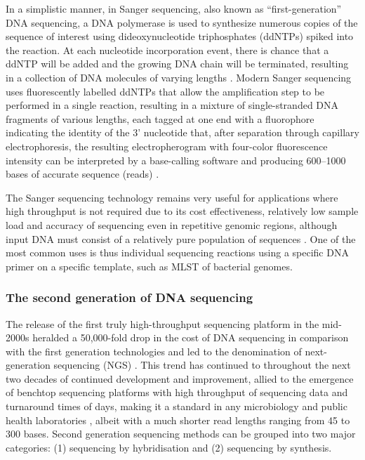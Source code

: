 In a simplistic manner, in Sanger sequencing, also known as “first-generation” DNA sequencing, a DNA polymerase is used to synthesize numerous copies of the sequence of interest using dideoxynucleotide triphosphates (ddNTPs) spiked into the reaction. At each nucleotide incorporation event, there is chance that a ddNTP will be added and the growing DNA chain will be terminated, resulting in a collection of DNA molecules of varying lengths \citep{sanger_dna_1977, hagemann_overview_2015}. Modern Sanger sequencing uses fluorescently labelled ddNTPs that allow the amplification step to be performed in a single reaction, resulting in a mixture of single-stranded DNA fragments of various lengths, each tagged at one end with a fluorophore indicating the identity of the 3' nucleotide that, after separation through capillary electrophoresis, the resulting electropherogram with four-color fluorescence intensity can be interpreted by a base-calling software and producing 600–1000 bases of accurate sequence (reads) \citep{hagemann_overview_2015}. 

The Sanger sequencing technology remains very useful for applications where high throughput is not required due to its cost effectiveness, relatively low sample load and accuracy of sequencing even in repetitive genomic regions, although input DNA must consist of a relatively pure population of sequences \citep{slatko_overview_2018}. One of the most common uses is thus individual sequencing reactions using a specific DNA primer on a specific template, such as MLST of bacterial genomes. 

\subsubsection{The second generation of DNA sequencing}

The release of the first truly high-throughput sequencing platform in the mid-2000s heralded a 50,000-fold drop in the cost of DNA sequencing in comparison with the first generation technologies and led to the denomination of next-generation sequencing (NGS) \citep{goodwin_coming_2016}. This trend has continued to throughout the next two decades of continued development and improvement, allied to the emergence of benchtop sequencing platforms with high throughput of sequencing data and turnaround times of days, making it a standard in any microbiology and public health laboratories \citep{loman_twenty_2015}, albeit with a much shorter read lengths ranging from 45 to 300 bases. Second generation sequencing methods can be grouped into two major categories: (1) sequencing by hybridisation and (2) sequencing by synthesis. 

